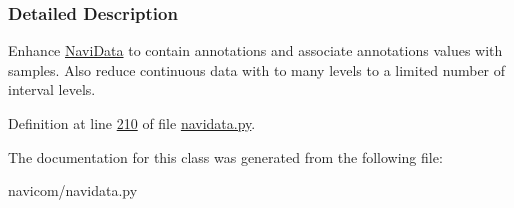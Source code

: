 \subsubsection{Detailed Description}
Enhance \hyperlink{classnavicom_1_1navidata_1_1NaviData}{NaviData} to contain annotations and associate annotations values with samples. Also reduce continuous data with to many levels to a limited number of interval levels. 

Definition at line \hyperlink{navidata_8py_source_l00210}{210} of file \hyperlink{navidata_8py_source}{navidata.py}.



The documentation for this class was generated from the following file:\begin{DoxyCompactItemize}
\item 
navicom/navidata.py\end{DoxyCompactItemize}
